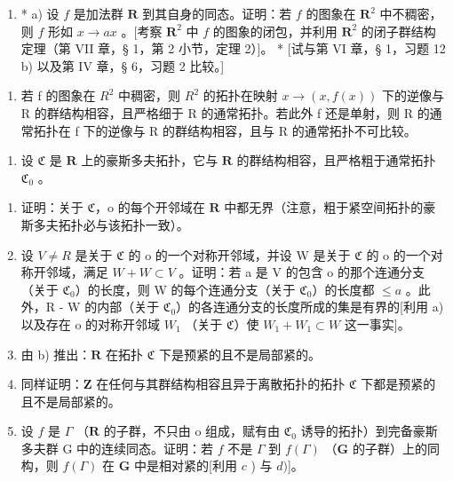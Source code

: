 \ExerciseSection

\begin{enumerate}
\def\labelenumi{\arabic{enumi})}
\tightlist
\item
  * a) 设 \(f\) 是加法群 \(\mathbf{R}\) 到其自身的同态。证明：若 \(f\) 的图象在 \(\mathbf{R}^2\) 中不稠密，则 \(f\) 形如 \(x \to ax\) 。{[}考察 \(\mathbf{R}^2\) 中 \(f\) 的图象的闭包，并利用 \(\mathbf{R}^2\) 的闭子群结构定理（第 VII 章，§ 1，第 2 小节，定理 2）{]}。 * {[}试与第 VI 章，§ 1，习题 12 b) 以及第 IV 章，§ 6，习题 2 比较。{]}
\end{enumerate}

\begin{enumerate}
\def\labelenumi{\alph{enumi})}
\setcounter{enumi}{1}
\tightlist
\item
  若 f 的图象在 \(R^{2}\) 中稠密，则 \(R^{2}\) 的拓扑在映射 \(x \to (x, f(x))\) 下的逆像与 R 的群结构相容，且严格细于 R 的通常拓扑。若此外 f 还是单射，则 R 的通常拓扑在 f 下的逆像与 R 的群结构相容，且与 R 的通常拓扑不可比较。
\end{enumerate}

\begin{enumerate}
\def\labelenumi{\arabic{enumi})}
\setcounter{enumi}{1}
\tightlist
\item
  设 \(\mathfrak{C}\) 是 \(\mathbf{R}\) 上的豪斯多夫拓扑，它与 \(\mathbf{R}\) 的群结构相容，且严格粗于通常拓扑 \(\mathfrak{C}_0\) 。
\end{enumerate}

\begin{enumerate}
\def\labelenumi{\alph{enumi})}
\item
  证明：关于 \(\mathfrak{C}\)，o 的每个开邻域在 \(\mathbf{R}\) 中都无界（注意，粗于紧空间拓扑的豪斯多夫拓扑必与该拓扑一致）。
\item
  设 \(V \neq R\) 是关于 \(\mathfrak{C}\) 的 o 的一个对称开邻域，并设 W 是关于 \(\mathfrak{C}\) 的 o 的一个对称开邻域，满足 \(W + W \subset V\) 。证明：若 a 是 V 的包含 o 的那个连通分支（关于 \(\mathfrak{C}_{0}\)）的长度，则 W 的每个连通分支（关于 \(\mathfrak{C}_{0}\)）的长度都 \(\leqslant a\) 。此外，R - W 的内部（关于 \(\mathfrak{C}_{0}\)）的各连通分支的长度所成的集是有界的{[}利用 a) 以及存在 o 的对称开邻域 \(W_{1}\) （关于 \(\mathfrak{C}\)）使 \(W_{1} + W_{1} \subset W\) 这一事实{]}。
\item
  由 b) 推出：\(\mathbf{R}\) 在拓扑 \(\mathfrak{C}\) 下是预紧的且不是局部紧的。
\item
  同样证明：\(\mathbf{Z}\) 在任何与其群结构相容且异于离散拓扑的拓扑 \(\mathfrak{C}\) 下都是预紧的且不是局部紧的。
\item
  设 \(f\) 是 \(\Gamma\) （\(\mathbf{R}\) 的子群，不只由 o 组成，赋有由 \(\mathfrak{C}_0\) 诱导的拓扑）到完备豪斯多夫群 G 中的连续同态。证明：若 \(f\) 不是 \(\Gamma\) 到 \(f(\Gamma)\) （\(\mathbf{G}\) 的子群）上的同构，则 \(f(\Gamma)\) 在 \(\mathbf{G}\) 中是相对紧的{[}利用 \(c\) ) 与 \(d)\){]}。
\end{enumerate}


